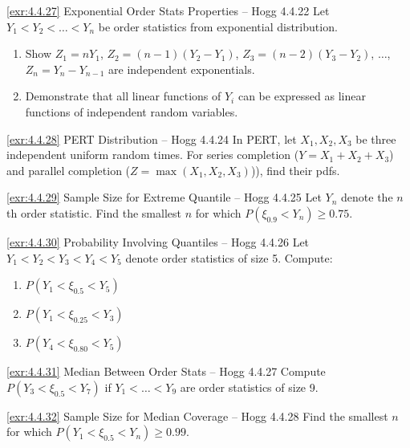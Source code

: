 \begin{exercise}{\ref{exr:4.4.27} Exponential Order Stats Properties – Hogg 4.4.22}\label{exr:4.4.27}
Let $Y_1 < Y_2 < \ldots < Y_n$ be order statistics from exponential distribution.
\begin{enumerate}
\item[(a)] Show $Z_1=nY_1$, $Z_2=(n-1)(Y_2-Y_1)$, $Z_3=(n-2)(Y_3-Y_2)$, $\ldots$, $Z_n=Y_n-Y_{n-1}$ are independent exponentials.
\item[(b)] Demonstrate that all linear functions of $Y_i$ can be expressed as linear functions of independent random variables.
\end{enumerate}
\end{exercise}

\begin{exercise}{\ref{exr:4.4.28} PERT Distribution – Hogg 4.4.24}\label{exr:4.4.28}
In PERT, let $X_1, X_2, X_3$ be three independent uniform random times. For series completion ($Y=X_1+X_2+X_3$) and parallel completion ($Z=\max(X_1,X_2,X_3)$)), find their pdfs.
\end{exercise}

\begin{exercise}{\ref{exr:4.4.29} Sample Size for Extreme Quantile – Hogg 4.4.25}\label{exr:4.4.29}
Let $Y_n$ denote the $n$th order statistic. Find the smallest $n$ for which $P(\xi_{0.9} < Y_n) \geq 0.75$.
\end{exercise}

\begin{exercise}{\ref{exr:4.4.30} Probability Involving Quantiles – Hogg 4.4.26}\label{exr:4.4.30}
Let $Y_1 < Y_2 < Y_3 < Y_4 < Y_5$ denote order statistics of size 5. Compute:
\begin{enumerate}
\item[(a)] $P(Y_1 < \xi_{0.5} < Y_5)$
\item[(b)] $P(Y_1 < \xi_{0.25} < Y_3)$
\item[(c)] $P(Y_4 < \xi_{0.80} < Y_5)$
\end{enumerate}
\end{exercise}

\begin{exercise}{\ref{exr:4.4.31} Median Between Order Stats – Hogg 4.4.27}\label{exr:4.4.31}
Compute $P(Y_3 < \xi_{0.5} < Y_7)$ if $Y_1 < \ldots < Y_9$ are order statistics of size 9.
\end{exercise}

\begin{exercise}{\ref{exr:4.4.32} Sample Size for Median Coverage – Hogg 4.4.28}\label{exr:4.4.32}
Find the smallest $n$ for which $P(Y_1 < \xi_{0.5} < Y_n) \geq 0.99$.
\end{exercise}

